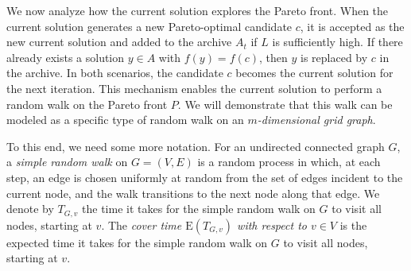 \documentclass[
sigconf = false, %
review = false, %
screen = true, %
anonymous = true, %
format=acmsmall
]{acmart}
\newcommand*{\E}{\mathrm{E}}
\newcommand{\LO}{\textsc{LO}\xspace}                      %
\newcommand{\TZ}{\textsc{TZ}\xspace}
\begin{document}

We now analyze how the current solution explores the Pareto front. When the current solution generates a new Pareto-optimal candidate $c$, it is accepted as the new current solution and added to the archive $A_t$ if $L$ is sufficiently high. If there already exists a solution $y \in A$ with $f(y)=f(c)$, then $y$ is replaced by $c$ in the archive. In both scenarios, the candidate $c$ becomes the current solution for the next iteration. This mechanism enables the current solution to perform a random walk on the Pareto front $P$. We will demonstrate that this walk can be modeled as a specific type of random walk on an \emph{$m$-dimensional grid graph}. %

To this end, we need some more notation. For an undirected connected graph $G$, a \emph{simple random walk} on $G=(V,E)$ is a random process in which, at each step, an edge is chosen uniformly at random from the set of edges incident to the current node, and the walk transitions to the next node along that edge. We denote by $T_{G,v}$ the time it takes for the simple random walk on $G$ to visit all nodes, starting at $v$. The \emph{cover time $\E(T_{G,v})$ with respect to $v \in V$} is the expected time it takes for the simple random walk on $G$ to visit all nodes, starting at $v$. %
\end{document}
